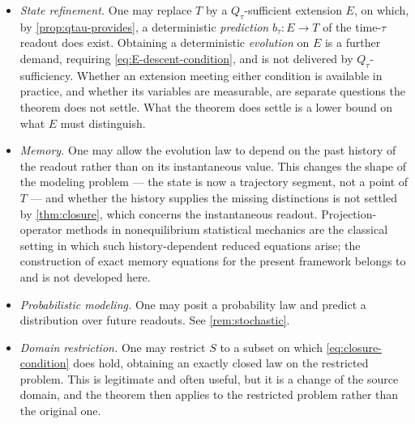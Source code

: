 \documentclass[11pt,reqno]{amsart}
\theoremstyle{plain}
\theoremstyle{definition}
\newcommand{\Src}{S}
\newcommand{\Rdt}{T}
\begin{document}
\begin{itemize}
\item \emph{State refinement.} One may replace $\Rdt$ by a $Q_\tau$-sufficient extension $E$, on
which, by \cref{prop:qtau-provides}, a deterministic \emph{prediction} $b_\tau\colon E\to\Rdt$ of
the time-$\tau$ readout does exist. Obtaining a deterministic \emph{evolution} on $E$ is a further
demand, requiring \eqref{eq:E-descent-condition}, and is not delivered by $Q_\tau$-sufficiency.
Whether an extension meeting either condition is available in practice, and whether its variables
are measurable, are separate questions the theorem does not settle. What the theorem does settle
is a lower bound on what $E$ must distinguish.

\item \emph{Memory.} One may allow the evolution law to depend on the past history of the readout
rather than on its instantaneous value. This changes the shape of the modeling problem --- the
state is now a trajectory segment, not a point of $\Rdt$ --- and whether the history supplies the
missing distinctions is not settled by \cref{thm:closure}, which concerns the instantaneous
readout. Projection-operator methods in nonequilibrium statistical mechanics
\cite{Zwanzig,Grabert} are the classical setting in which such history-dependent reduced
equations arise; the construction of exact memory equations for the present framework belongs to
\cite{ShadowV} and is not developed here.

\item \emph{Probabilistic modeling.} One may posit a probability law and predict a distribution
over future readouts. See \cref{rem:stochastic}.

\item \emph{Domain restriction.} One may restrict $\Src$ to a subset on which
\eqref{eq:closure-condition} does hold, obtaining an exactly closed law on the restricted
problem. This is legitimate and often useful, but it is a change of the source domain, and the
theorem then applies to the restricted problem rather than the original one.
\end{itemize}
\end{document}
